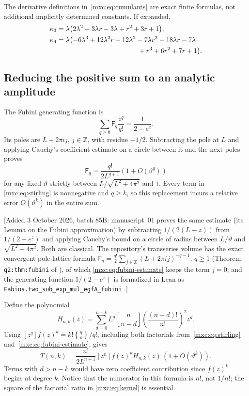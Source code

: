 \documentclass[11pt]{article}
\numberwithin{equation}{section}
\theoremstyle{definition}
\theoremstyle{remark}
\newcommand{\StirOne}[2]{\genfrac{[}{]}{0pt}{}{#1}{#2}}
\newcommand{\StirTwo}[2]{\genfrac{\{} {\}}{0pt}{}{#1}{#2}}
\begin{document}
The derivative definitions in~\eqref{mxc:eq:cumulants} are exact finite
formulas, not additional implicitly determined constants. If expanded,
\begin{align*}
 \kappa_3&=\lambda\bigl(2\lambda^2-3\lambda r-3\lambda
                  +r^2+3r+1\bigr),\\
 \kappa_4&=\lambda\bigl(-6\lambda^3+12\lambda^2r+12\lambda^2
                  -7\lambda r^2-18\lambda r-7\lambda\\
 &\hspace{42mm}{}+r^3+6r^2+7r+1\bigr).
\end{align*}

\subsection{Reducing the positive sum to an analytic amplitude}
The Fubini generating function is
\[
 \sum_{q\ge0}\mathsf F_q\frac{z^q}{q!}=\frac1{2-e^z}.
\]
Its poles are $L+2\pi i j$, $j\in\mathbb Z$, with residue $-1/2$.
Subtracting the pole at $L$ and applying Cauchy's coefficient estimate
on a circle between it and the next poles proves
\begin{equation}\label{mxc:eq:fubini-estimate}
 \mathsf F_q=\frac{q!}{2L^{q+1}}(1+O(\vartheta^q))
\end{equation}
for any fixed $\vartheta$ strictly between
$L/\sqrt{L^2+4\pi^2}$ and $1$. Every term in
\eqref{mxc:eq:stirling} is nonnegative and $q\ge k$, so this replacement
incurs a relative error $O(\vartheta^k)$ in the entire sum.

[Added 3 October 2026, batch 85B: manuscript~01 proves the same estimate
(its Lemma on the Fubini approximation) by subtracting $1/(2(L-z))$ from
$1/(2-e^z)$ and applying Cauchy's bound on a circle of radius between
$L/\vartheta$ and $\sqrt{L^2+4\pi^2}$. Both are classical. The repository's
transseries volume has the exact convergent pole-lattice formula
$\mathsf F_q=\frac{q!}2\sum_{j\in\mathbb Z}(L+2\pi ij)^{-q-1}$, $q\ge1$
(Theorem \texttt{q2:thm:fubini} of \cite{tsvol}), of which
\eqref{mxc:eq:fubini-estimate} keeps the term $j=0$; and the generating
function $1/(2-e^z)$ is formalized in Lean as
\texttt{Fabius.two\_sub\_exp\_mul\_egfA\_fubini} \cite{leanob}.]

Define the polynomial
\begin{equation}\label{mxc:eq:kernel}
 H_{n,k}(z)=\sum_{d=0}^{n-k}
 L^d\StirOne{n}{n-d}\left(\frac{(n-d)!}{n!}\right)^2 z^d.
\end{equation}
Using $[z^q]f(z)^k=k!\StirTwo{q}{k}/q!$, including both factorials
from~\eqref{mxc:eq:stirling} and~\eqref{mxc:eq:fubini-estimate}, gives
\begin{equation}\label{mxc:eq:dense-reduction}
 T(n,k)=\frac{n!}{2L^{n+1}}
  [z^n]f(z)^kH_{n,k}(z)\,(1+O(\vartheta^k)).
\end{equation}
Terms with $d>n-k$ would have zero coefficient contribution since
$f(z)^k$ begins at degree $k$. Notice that the numerator in this
formula is $n!$, not $1/n!$; the square of the factorial ratio in
\eqref{mxc:eq:kernel} is essential.
\end{document}
